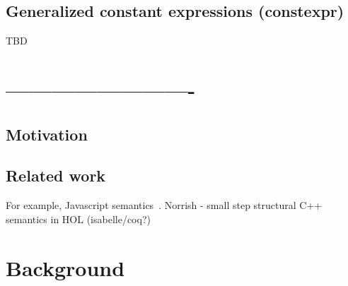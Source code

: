 \documentclass{fithesis3}
\begin{document}





\section{Generalized constant expressions (constexpr)}
TBD


\ifshowoldstuff

\chapter{-------------------------}

\section{Motivation}

\section{Related work}
For example, Javascript semantics~\cite{park-stefanescu-rosu-2015-pldi}.
Norrish - small step structural C++ semantics in HOL (isabelle/coq?)


\chapter{Background}
\end{document}
